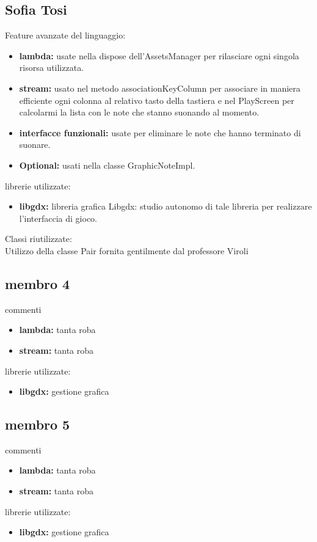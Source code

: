 \documentclass[a4paper,12pt]{report}
\begin{document}
\subsection{Sofia Tosi}
Feature avanzate del linguaggio:
\begin{itemize}
	\item \textbf{lambda:} usate nella dispose dell'AssetsManager per rilasciare ogni singola risorsa utilizzata.
	\item \textbf{stream:} usato nel metodo associationKeyColumn per associare in maniera efficiente ogni colonna al relativo tasto della tastiera e nel PlayScreen per calcolarmi la lista con le note che stanno suonando al momento.
	\item \textbf{interfacce funzionali:} usate per eliminare le note che hanno terminato di suonare.
	\item \textbf{Optional:} usati nella classe GraphicNoteImpl.
\end{itemize}
librerie utilizzate:
\begin{itemize}
	\item \textbf{libgdx:} libreria grafica Libgdx: studio autonomo di tale libreria per realizzare l'interfaccia di gioco.
\end{itemize}
Classi riutilizzate: \\
Utilizzo della classe Pair fornita gentilmente dal professore Viroli
\newpage

\newpage

\subsection{membro 4}
commenti
\begin{itemize}
	\item \textbf{lambda:} tanta roba
	\item \textbf{stream:} tanta roba
\end{itemize}
librerie utilizzate:
\begin{itemize}
	\item \textbf{libgdx:} gestione grafica
\end{itemize}
\newpage

\subsection{membro 5}
commenti
\begin{itemize}
	\item \textbf{lambda:} tanta roba
	\item \textbf{stream:} tanta roba
\end{itemize}
librerie utilizzate:
\begin{itemize}
	\item \textbf{libgdx:} gestione grafica
\end{itemize}
\newpage
\end{document}

